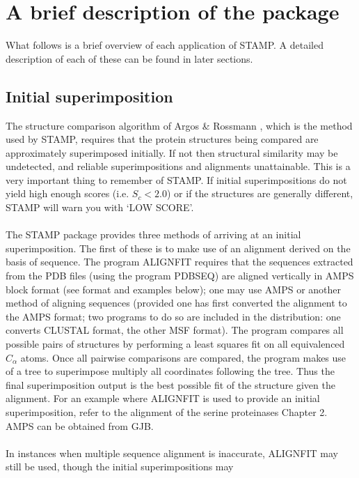 \section{A brief description of the package}

What follows is a brief overview of each application of STAMP.  A
detailed description of each of these can be found in later
sections.

\subsection{Initial superimposition}

The structure comparison algorithm of Argos \& Rossmann
\cite{argos76}, which is the method used by STAMP, requires that the 
protein structures being compared are approximately superimposed 
initially.  If not then structural similarity may be undetected, and 
reliable superimpositions and alignments unattainable.  This is a very important
thing to remember of STAMP.  If initial superimpositions do not yield high
enough scores (i.e. $S_{c} < 2.0$) or if the structures are generally different, 
STAMP will warn you with `LOW SCORE'.\\
\\
The STAMP package provides three methods of arriving at an initial 
superimposition.  The first of these is to make use of an alignment
derived on the basis of sequence.  The program ALIGNFIT requires
that the sequences extracted from the PDB files (using the program
PDBSEQ) are aligned vertically in AMPS block format (see format and
examples below); one may use AMPS or another method of aligning sequences 
(provided one has first converted the alignment to the AMPS format; 
two programs to do so are included in the distribution: one converts CLUSTAL
format, the other MSF format).
The program compares all possible pairs of
structures by performing a least squares fit on all equivalenced 
$C_{\alpha}$ atoms.  Once all pairwise comparisons are compared, the
program makes use of a tree to superimpose  multiply all
coordinates following the tree.  Thus the final superimposition
output is the best possible fit of the structure given the
alignment.  For an example where ALIGNFIT is used to provide an
initial superimposition, refer to the alignment of the serine
proteinases Chapter 2.  AMPS can be obtained from GJB.\\
\\
In instances when multiple sequence alignment is inaccurate,
ALIGNFIT may still be used, though the initial superimpositions may
